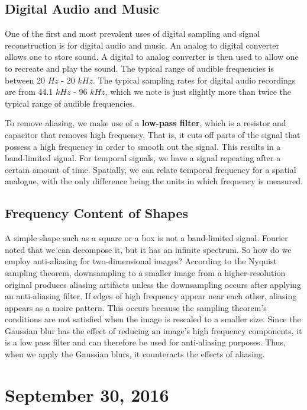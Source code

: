 \documentclass[11pt]{article}
\theoremstyle{plain} %
\theoremstyle{definition}
\theoremstyle{example}
\theoremstyle{remark}
\begin{document}
\subsection{Digital Audio and Music}

One of the first and most prevalent uses of digital sampling and signal reconstruction is for digital audio and music. An analog to digital converter allows one to store sound. A digital to analog converter is then used to allow one to recreate and play the sound. The typical range of audible frequencies is between 20 $ Hz$ - 20 $kHz$. The typical sampling rates for digital audio recordings are from 44.1 $kHz$ - 96 $kHz$, which we note is just slightly more than twice the typical range of audible frequencies.

To remove aliasing, we make use of a \textbf{low-pass filter}, which is a resistor and capacitor that removes high frequency. That is, it cuts off parts of the signal that possess a high frequency in order to smooth out the signal. This results in a band-limited signal. For temporal signals, we have a signal repeating after a certain amount of time. Spatially, we can relate temporal frequency for a spatial analogue, with the only difference being the units in which frequency is measured. 

\subsection{Frequency Content of Shapes} 
A simple shape such as a square or a box is not a band-limited signal. Fourier noted that we can decompose it, but it has an infinite spectrum. So how do we employ anti-aliasing for two-dimensional images? According to the Nyquist sampling theorem, downsampling to a smaller image from a higher-resolution original produces aliasing artifacts unless the downsampling occurs after applying an anti-aliasing filter. If edges of high frequency appear near each other, aliasing appears as a moire pattern. This occurs because the sampling theorem's conditions are not satisfied when the image is rescaled to a smaller size. Since the Gaussian blur has the effect of reducing an image's high frequency components, it is a low pass filter and can therefore be used for anti-aliasing purposes. Thus, when we apply the Gaussian blurs, it counteracts the effects of aliasing.

\section{September 30, 2016}
\end{document}
